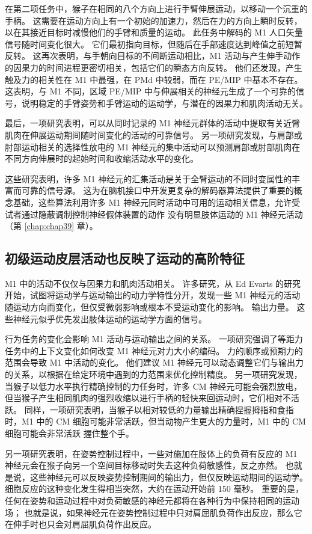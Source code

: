 在第二项任务中，猴子在相同的八个方向上进行手臂伸展运动，以移动一个沉重的手柄。 这需要在运动方向上有一个初始的加速力，然后在力的方向上瞬时反转，以在其接近目标时减慢他们的手臂和质量的运动。 此任务中解码的 M1 人口矢量信号随时间变化很大。 它们最初指向目标，但随后在手部速度达到峰值之前短暂反转。 这再次表明，与手朝向目标的不间断运动相比，M1 活动与产生伸手动作的因果力的时间进程更密切相关，包括它们的瞬态方向反转。 他们还发现，产生触及力的相关性在 M1 中最强，在 PMd 中较弱，而在 PE/MIP 中基本不存在。 这表明，与 M1 不同，区域 PE/MIP 中与伸展相关的神经元生成了一个可靠的信号，说明稳定的手臂姿势和手臂运动的运动学，与潜在的因果力和肌肉活动无关。

最后，一项研究表明，可以从同时记录的 M1 神经元群体的活动中提取有关近臂肌肉在伸展运动期间随时间变化的活动的可靠信号。 另一项研究发现，与肩部或肘部运动相关的选择性放电的 M1 神经元的集中活动可以预测肩部或肘部肌肉在不同方向伸展时的起始时间和收缩活动水平的变化。

这些研究表明，许多 M1 神经元的汇集活动是关于全臂运动的不同时变属性的丰富而可靠的信号源。 这为在脑机接口中开发更复杂的解码器算法提供了重要的概念基础，这些算法利用许多 M1 神经元同时活动中可用的运动相关信息，允许受试者通过隐蔽调制控制神经假体装置的动作 没有明显肢体运动的 M1 神经元活动（第 \ref{chap:chap39} 章）。


\subsection{初级运动皮层活动也反映了运动的高阶特征}
M1 中的活动不仅仅与因果力和肌肉活动相关。 许多研究，从 Ed Evarts 的研究开始，试图将运动学与运动输出的动力学特性分开，发现一些 M1 神经元的活动随运动方向而变化，但仅受微弱影响或根本不受运动变化的影响。 输出力量。 这些神经元似乎优先发出肢体运动的运动学方面的信号。

行为任务的变化会影响 M1 活动与运动输出之间的关系。 一项研究强调了等距力任务中的上下文变化如何改变 M1 神经元对力大小的编码。 力的顺序或预期力的范围会导致 M1 中活动的变化。 他们建议 M1 神经元可以动态调整它们与输出力的关系，以根据在给定环境中遇到的力范围来优化控制精度。 另一项研究发现，当猴子以低力水平执行精确控制的力任务时，许多 CM 神经元可能会强烈放电，但当猴子产生相同肌肉的强烈收缩以进行手柄的轻快来回运动时，它们相对不活跃。 同样，一项研究表明，当猴子以相对较低的力量输出精确捏握拇指和食指时，M1 中的 CM 细胞可能非常活跃，但当动物产生更大的力量时，M1 中的 CM 细胞可能会非常活跃 握住整个手。

另一项研究表明，在姿势控制过程中，一些对施加在肢体上的负荷有反应的 M1 神经元会在猴子向另一个空间目标移动时失去这种负荷敏感性，反之亦然。 也就是说，这些神经元可以反映姿势控制期间的输出力，但仅反映运动期间的运动学。 细胞反应的这种变化发生得相当突然，大约在运动开始前 150 毫秒。 重要的是，任何在姿势和运动过程中对负荷敏感的神经元都将在各种行为中保持相同的运动场； 也就是说，如果神经元在姿势控制过程中只对肩屈肌负荷作出反应，那么它在伸手时也只会对肩屈肌负荷作出反应。

